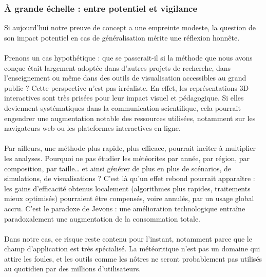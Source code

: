 \documentclass[12pt]{article}
\begin{document}
\subsubsection*{À grande échelle : entre potentiel et vigilance}

Si aujourd’hui notre preuve de concept a une empreinte modeste, la question de son impact potentiel en cas de généralisation mérite une réflexion honnête.\\
\\
Prenons un cas hypothétique : que se passerait-il si la méthode que nous avons conçue était largement adoptée dans d’autres projets de recherche, dans l’enseignement ou même dans des outils de visualisation accessibles au grand public ? Cette perspective n’est pas irréaliste. En effet, les représentations 3D interactives sont très prisées pour leur impact visuel et pédagogique. Si elles deviennent systématiques dans la communication scientifique, cela pourrait engendrer une augmentation notable des ressources utilisées, notamment sur les navigateurs web ou les plateformes interactives en ligne.\\
\\
Par ailleurs, une méthode plus rapide, plus efficace, pourrait inciter à multiplier les analyses. Pourquoi ne pas étudier les météorites par année, par région, par composition, par taille… et ainsi générer de plus en plus de scénarios, de simulations, de visualisations ? C’est là qu’un effet rebond pourrait apparaître : les gains d’efficacité obtenus localement (algorithmes plus rapides, traitements mieux optimisés) pourraient être compensés, voire annulés, par un usage global accru. C’est le paradoxe de Jevons : une amélioration technologique entraîne paradoxalement une augmentation de la consommation totale.\\
\\
Dans notre cas, ce risque reste contenu pour l’instant, notamment parce que le champ d’application est très spécialisé. La météoritique n’est pas un domaine qui attire les foules, et les outils comme les nôtres ne seront probablement pas utilisés au quotidien par des millions d’utilisateurs.
 
\end{document}
